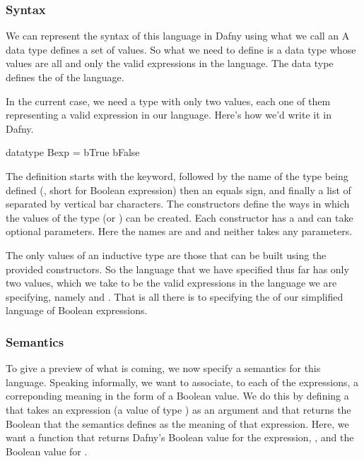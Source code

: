 \documentclass[letterpaper,10pt,english]{sphinxmanual}
\begin{document}
\subsubsection{Syntax}
\label{\detokenize{07-boolean-algebra:syntax}}
We can represent the syntax of this language in Dafny using what we
call an  A data type defines a set of
values. So what we need to define is a data type whose values are all
and only the valid expressions in the language. The data type defines
the  of the language.

In the current case, we need a type with only two values, each one of
them representing a valid expression in our language. Here’s how we’d
write it in Dafny.

\begin{sphinxVerbatim}[commandchars=\\\{\}]
datatype Bexp =
     bTrue \textbar{}
     bFalse
\end{sphinxVerbatim}

The definition starts with the  keyword, followed by the
name of the type being defined (, short for Boolean expression)
then an equals sign, and finally a list of  separated by
vertical bar characters. The constructors define the ways in which the
values of the type (or ) can be created. Each constructor has a
and can take optional parameters. Here the names are  and
 and neither takes any parameters.

The only values of an inductive type are those that can be built using
the provided constructors. So the language that we have specified thus
far has only two values, which we take to be the valid expressions in
the language we are specifying, namely  and .  That is
all there is to specifying the  of our simplified language of
Boolean expressions.


\subsubsection{Semantics}
\label{\detokenize{07-boolean-algebra:semantics}}
To give a preview of what is coming, we now specify a semantics for
this language. Speaking informally, we want to associate, to each of
the expressions, a correponding meaning in the form of a Boolean
value.  We do this by defining a  that takes an expression
(a value of type ) as an argument and that returns the Boolean
 that the semantics defines as the meaning of that expression.
Here, we want a function that returns Dafny’s Boolean value  for
the expression, , and the Boolean value  for .
\end{document}
